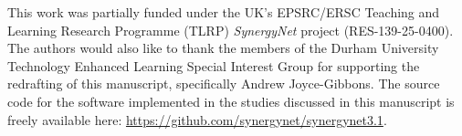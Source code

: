 \documentclass[link]{IWCOMP}
\begin{document}
\begin{ack}

This work was partially funded under the UK's EPSRC/ERSC Teaching and Learning Research Programme (TLRP) {\emph{SynergyNet}} project (RES-139-25-0400).
The authors would also like to thank the members of the Durham University Technology Enhanced Learning Special Interest Group for supporting the redrafting of this manuscript, specifically Andrew Joyce-Gibbons.
The source code for the software implemented in the studies discussed in this manuscript is freely available here: \url{https://github.com/synergynet/synergynet3.1}.

\end{ack}

\makeatletter
\def\@biblabel#1{}
\makeatother



\end{document}

